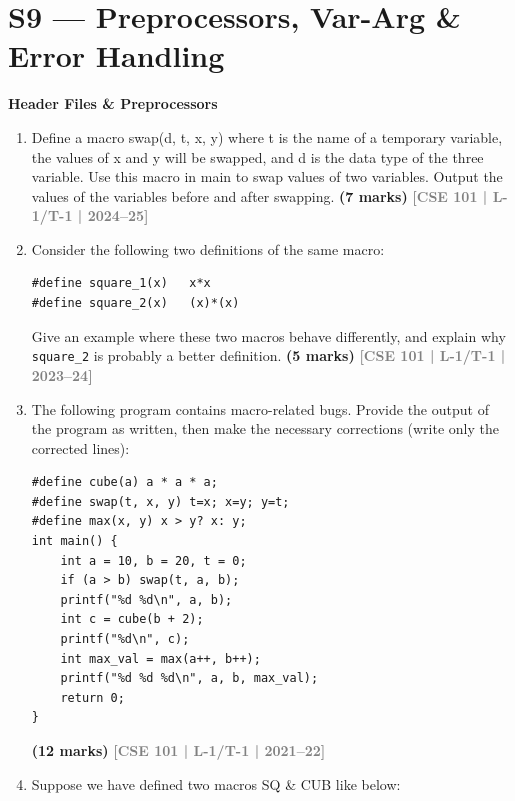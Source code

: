 \documentclass[12pt,a3paper]{article}
\newcommand{\yr}[1]{\hfill\textcolor{gray}{\small\textbf{[#1]}}}
\newcommand{\mk}[1]{\textcolor{orange!70!black}{\small\textbf{(#1 marks)}}}
\newcommand{\subtopic}[2]{%
  \vspace{10pt}
  \noindent\begin{tcolorbox}[colback=#1!8,colframe=#1,boxrule=0.6pt,arc=4pt,
    left=6pt,right=6pt,top=4pt,bottom=4pt]
    \small\bfseries\textcolor{#1}{#2}
  \end{tcolorbox}
  \vspace{2pt}
}
\begin{document}
\section{S9 --- Preprocessors, Var-Arg \& Error Handling}
\label{sec:S9}

\subtopic{cD}{Header Files \& Preprocessors}
\label{sub:s9-preproc}

\begin{enumerate}

\item Define a macro swap(d, t, x, y) where t is the name of a temporary variable, the values of x and y will be swapped, and d is the data type of the three variable. Use this macro in main to swap values of two variables. Output the values of the variables before and after swapping.
\mk{7} \yr{CSE 101 | L-1/T-1 | 2024--25}
   

\item Consider the following two definitions of the same macro:
 
\begin{lstlisting}
#define square_1(x)   x*x
#define square_2(x)   (x)*(x)
\end{lstlisting}
Give an example where these two macros behave differently, and explain why \texttt{square\_2} is probably a better definition.
\mk{5} \yr{CSE 101 | L-1/T-1 | 2023--24}

\item The following program contains macro-related bugs. Provide the output of the program as written, then make the necessary corrections (write only the corrected lines):
 
\begin{lstlisting}
#define cube(a) a * a * a;
#define swap(t, x, y) t=x; x=y; y=t;
#define max(x, y) x > y? x: y;
int main() {
    int a = 10, b = 20, t = 0;
    if (a > b) swap(t, a, b);
    printf("%d %d\n", a, b);
    int c = cube(b + 2);
    printf("%d\n", c);
    int max_val = max(a++, b++);
    printf("%d %d %d\n", a, b, max_val);
    return 0;
}
\end{lstlisting}
\mk{12} \yr{CSE 101 | L-1/T-1 | 2021--22}

\item Suppose we have defined two macros SQ \& CUB like below:


\end{enumerate}
\end{document}
